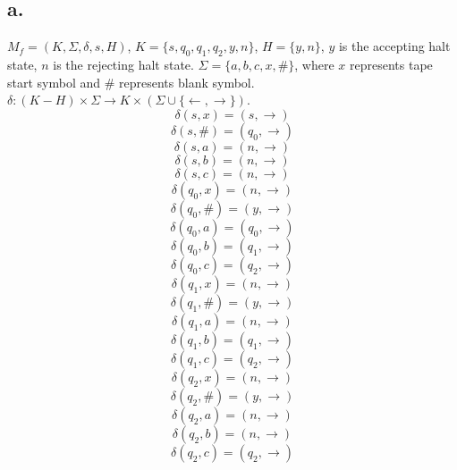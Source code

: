 \documentclass[12pt]{article}
\begin{document}
\subsection*{a.}
$M_f = (K, \Sigma, \delta, s, H)$, $K=\{s, q_0, q_1, q_2, y, n\}$, $H=\{y,n\}$,
$y$ is the accepting halt state, $n$ is the rejecting halt state.
$\Sigma = \{a,b,c,x,\#\}$, where $x$ represents tape start symbol and $\#$
represents blank symbol. $\delta : (K-H)\times \Sigma \rightarrow K\times 
(\Sigma \cup \{\leftarrow, \rightarrow\})$.
$$\delta(s,x)=(s, \rightarrow)$$
$$\delta(s,\#)=(q_0, \rightarrow)$$
$$\delta(s,a)=(n, \rightarrow)$$
$$\delta(s,b)=(n, \rightarrow)$$
$$\delta(s,c)=(n, \rightarrow)$$
$$\delta(q_0,x)=(n, \rightarrow)$$
$$\delta(q_0,\#)=(y, \rightarrow)$$
$$\delta(q_0,a)=(q_0, \rightarrow)$$
$$\delta(q_0,b)=(q_1, \rightarrow)$$
$$\delta(q_0,c)=(q_2, \rightarrow)$$
$$\delta(q_1,x)=(n, \rightarrow)$$
$$\delta(q_1,\#)=(y, \rightarrow)$$
$$\delta(q_1,a)=(n, \rightarrow)$$
$$\delta(q_1,b)=(q_1, \rightarrow)$$
$$\delta(q_1,c)=(q_2, \rightarrow)$$
$$\delta(q_2,x)=(n, \rightarrow)$$
$$\delta(q_2,\#)=(y, \rightarrow)$$
$$\delta(q_2,a)=(n, \rightarrow)$$
$$\delta(q_2,b)=(n, \rightarrow)$$
$$\delta(q_2,c)=(q_2, \rightarrow)$$
\end{document}
